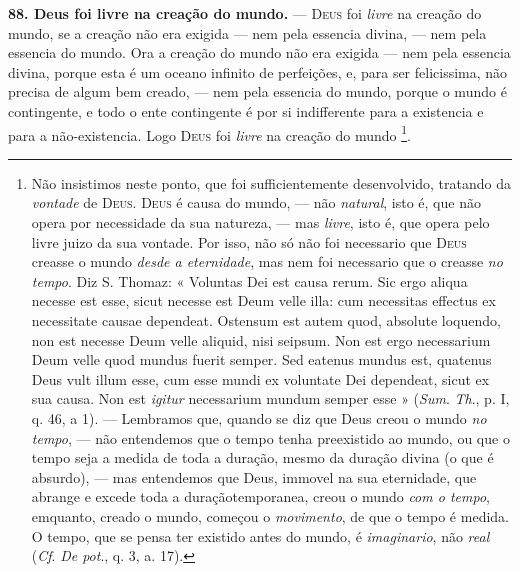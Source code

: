  \textbf{88. Deus foi livre na creação do mundo.} --- \textsc{Deus} foi \emph{livre} na creação do mundo, se a creação não era exigida --- nem pela essencia divina, --- nem pela essencia do mundo. Ora a creação do mundo não era exigida --- nem pela essencia divina, porque esta é um oceano infinito de perfeições, e, para ser felicissima, não precisa de algum bem creado, --- nem pela essencia do mundo, porque o mundo é contingente, e todo o ente contingente é por si indifferente para a existencia e para a não-existencia. Logo \textsc{Deus} foi \emph{livre} na creação do mundo \footnote{Não insistimos neste ponto, que foi sufficientemente desenvolvido, tratando da \emph{vontade} de \textsc{Deus}. \textsc{Deus} é causa do mundo, --- não \emph{natural}, isto é, que não opera por necessidade da sua natureza, --- mas \emph{livre}, isto é, que opera pelo livre juizo da sua vontade. Por isso, não só não foi necessario que \textsc{Deus} creasse o mundo \emph{desde a eternidade}, mas nem foi necessario que o creasse \emph{no tempo}. Diz S. Thomaz: « Voluntas Dei est causa rerum. Sic ergo aliqua necesse est esse, sicut necesse est Deum velle illa: cum necessitas effectus ex necessitate causae dependeat. Ostensum est autem quod, absolute loquendo, non est necesse Deum velle aliquid, nisi seipsum. Non est ergo necessarium Deum velle quod mundus fuerit semper. Sed eatenus mundus est, quatenus Deus vult illum esse, cum esse mundi ex voluntate Dei dependeat, sicut ex sua causa. Non est \emph{igitur} necessarium mundum semper esse » (\emph{Sum}. \emph{Th}., p. I, q. 46, a 1). --- Lembramos que, quando se diz que Deus creou o mundo \emph{no tempo}, --- não entendemos que o tempo tenha preexistido ao mundo, ou que o tempo seja a medida de toda a duração, mesmo da duração divina (o que é absurdo), --- mas entendemos que Deus, immovel na sua eternidade, que abrange e excede toda a duraçãotemporanea, creou o mundo \emph{com o tempo}, emquanto, creado o mundo, começou o \emph{movimento}, de que o tempo é medida. O tempo, que se pensa ter existido antes do mundo, é \emph{imaginario}, não \emph{real} (\emph{Cf}. \emph{De pot}., q. 3, a. 17).}.

